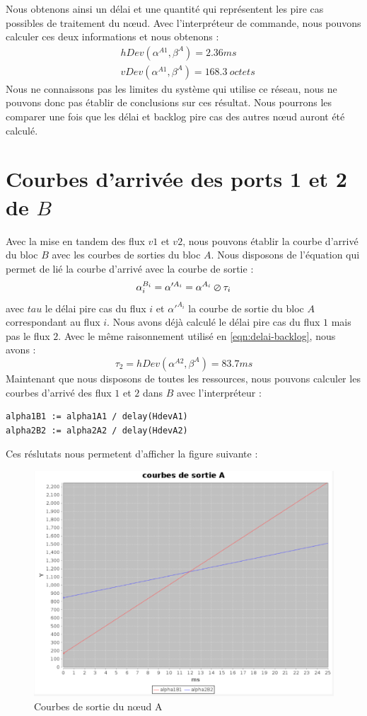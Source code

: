 Nous obtenons ainsi un délai et une quantité qui représentent les pire cas possibles de traitement du nœud. Avec l'interpréteur de commande, nous pouvons calculer ces deux informations et nous obtenons : \begin{align}\label{eqn:delai-backlog}
&hDev(\alpha^{A1},\beta^A) = 2.36 ms\\
&vDev(\alpha^{A1},\beta^A) = 168.3\ octets
\end{align}
Nous ne connaissons pas les limites du système qui utilise ce réseau, nous ne pouvons donc pas établir de conclusions sur ces résultat. Nous pourrons les comparer une fois que les délai et backlog pire cas des autres nœud auront été calculé.

\section{Courbes d'arrivée des ports 1 et 2 de $B$}\label{sub:sortiesAs}
Avec la mise en tandem des flux $v1$ et $v2$, nous pouvons établir la courbe d'arrivé du bloc $B$ avec les courbes de sorties du bloc $A$. Nous disposons de l'équation qui permet de lié la courbe d'arrivé avec la courbe de sortie :
 \begin{equation}
\alpha_i^{B_i} = \alpha'^{A_i} = \alpha^{A_i} \varoslash \tau_i
\end{equation} avec $tau$ le délai pire cas du flux $i$ et $\alpha'^{A_i}$ la courbe de sortie du bloc $A$ correspondant au flux $i$. Nous avons déjà calculé le délai pire cas du flux $1$ mais pas le flux $2$. Avec le même raisonnement utilisé en \ref{eqn:delai-backlog}, nous avons :
\begin{equation}
\tau_2 = hDev(\alpha^{A2}, \beta^{A}) = 83.7ms
\end{equation}
Maintenant que nous disposons de toutes les ressources, nous pouvons calculer les courbes d'arrivé des flux $1$ et $2$ dans $B$ avec l'interpréteur : \begin{verbatim}
alpha1B1 := alpha1A1 / delay(HdevA1)
alpha2B2 := alpha2A2 / delay(HdevA2)
\end{verbatim}
Ces réslutats nous permetent d'afficher la figure suivante :
\begin{figure}[!ht]
\centering
\includegraphics[width = .6\textwidth]{./I/images/sortiesA.png}
\caption{\label{fig:sortieA}Courbes de sortie du nœud A}
\end{figure} 
